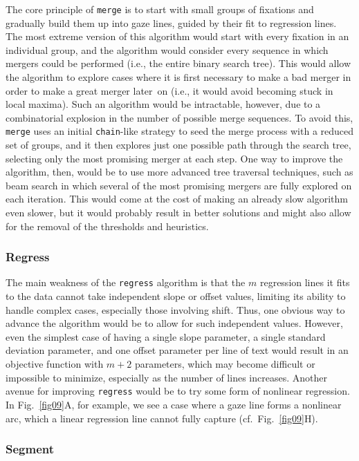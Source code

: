 \documentclass[doc,biblatex]{apa7}
\begin{document}
The core principle of \texttt{merge} is to start with small groups of fixations and gradually build them up into gaze lines, guided by their fit to regression lines. The most extreme version of this algorithm would start with every fixation in an individual group, and the algorithm would consider every sequence in which mergers could be performed (i.e., the entire binary search tree). This would allow the algorithm to explore cases where it is first necessary to make a bad merger in order to make a great merger later~on (i.e., it would avoid becoming stuck in local maxima). Such an algorithm would be intractable, however, due to a combinatorial explosion in the number of possible merge sequences. To avoid this, \texttt{merge} uses an initial \texttt{chain}-like strategy to seed the merge process with a reduced set of groups, and it then explores just one possible path through the search tree, selecting only the most promising merger at each step. One way to improve the algorithm, then, would be to use more advanced tree traversal techniques, such as beam search in which several of the most promising mergers are fully explored on each iteration. This would come at the cost of making an already slow algorithm even slower, but it would probably result in better solutions and might also allow for the removal of the thresholds and heuristics.

\subsubsection{Regress}

The main weakness of the \texttt{regress} algorithm is that the $m$ regression lines it fits to the data cannot take independent slope or offset values, limiting its ability to handle complex cases, especially those involving shift. Thus, one obvious way to advance the algorithm would be to allow for such independent values. However, even the simplest case of having a single slope parameter, a single standard deviation parameter, and one offset parameter per line of text would result in an objective function with $m+2$ parameters, which may become difficult or impossible to minimize, especially as the number of lines increases. Another avenue for improving \texttt{regress} would be to try some form of nonlinear regression. In Fig.~\ref{fig09}A, for example, we see a case where a gaze line forms a nonlinear arc, which a linear regression line cannot fully capture (cf.~Fig.~\ref{fig09}H).

\subsubsection{Segment}
\end{document}
